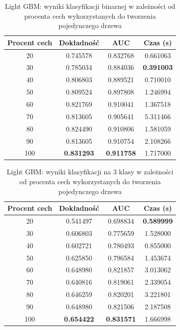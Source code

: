 \documentclass[a4paper, twoside, 11pt, openright]{article}
\begin{document}
\begin{table}[H]
    \centering
    \begin{tabular}{|c|c|c|c|}
    \hline
        \textbf{Procent cech} & \textbf{Dokładność} & \textbf{AUC} & \textbf{Czas (s)} \\ \hline
20              &  0.745578 &  0.832768 &    0.661063 \\ \hline
30              &  0.785034 &  0.884036 &    \textbf{0.391003} \\ \hline
40              &  0.806803 &  0.889521 &    0.710010 \\ \hline
50             &  0.809524 &  0.897808 &    1.246994 \\ \hline
60              &  0.821769 &  0.910041 &    1.367518 \\ \hline
70              &  0.813605 &  0.905641 &    5.311466 \\ \hline
80              &  0.824490 &  0.910806 &    1.581059 \\ \hline
90              &  0.813605 &  0.910754 &    2.108266 \\ \hline
100              &  \textbf{0.831293} &  \textbf{0.911758} &    1.717000 \\ \hline
    \end{tabular}
    \caption{Light GBM: wyniki klasyfikacji binarnej w zależności od procenta cech wykorzystanych do tworzenia pojedynczego drzewa}
    \label{tab:lgbm_feature_fraction_binary}
\end{table}

\begin{table}[H]
    \centering
    \begin{tabular}{|c|c|c|c|}
    \hline
        \textbf{Procent cech} & \textbf{Dokładność} & \textbf{AUC} & \textbf{Czas (s)} \\ \hline
20          &  0.541497 &  0.698834 &    \textbf{0.589999} \\ \hline
30              &  0.606803 &  0.775659 &    1.528000 \\ \hline
40              &  0.602721 &  0.780493 &    0.855000 \\ \hline
50              &  0.625850 &  0.796584 &    1.453674 \\ \hline
60              &  0.648980 &  0.821857 &    3.013062 \\ \hline
70              &  0.640816 &  0.819061 &    2.339054 \\ \hline
80              &  0.646259 &  0.820201 &    3.221801 \\ \hline
90              &  0.648980 &  0.821506 &    2.187508 \\ \hline
100              &  \textbf{0.654422} &  \textbf{0.831571} &    1.666998 \\ \hline
    \end{tabular}
    \caption{Light GBM: wyniki klasyfikacji na 3 klasy w zależności od procenta cech wykorzystanych do tworzenia pojedynczego drzewa}
    \label{tab:lgbm_feature_fraction_discrete}
\end{table}
\end{document}
